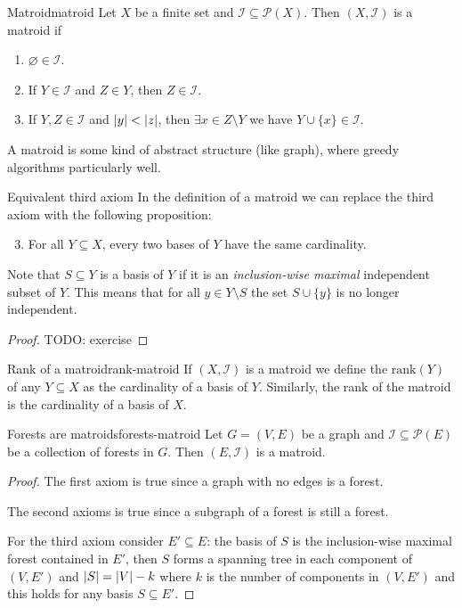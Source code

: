 \documentclass[12pt]{extarticle}
\begin{document}
\begin{definition}{Matroid}{matroid}
	Let $X$ be a finite set and $\mathcal I \subseteq \mathcal P(X)$.
	Then $(X, \mathcal I)$ is a matroid if
	\begin{enumerate}
		\item $\varnothing \in \mathcal I$.
		\item If $Y \in \mathcal I$ and $Z \in Y$, then $Z \in \mathcal I$.
		\item If $Y, Z \in \mathcal I$ and $\abs{y} < \abs{z}$, then $\exists x \in Z \setminus Y$ we
		      have $Y \cup \{x\} \in \mathcal I$.
	\end{enumerate}
\end{definition}

A matroid is some kind of abstract structure (like graph), where greedy algorithms 
particularly well.

\begin{lemma}{Equivalent third axiom}{}
	In the definition of a matroid we can replace the third axiom with the following proposition:
	\begin{enumerate}
		\setcounter{enumi}{2}
		\item For all $Y \subseteq X$, every two bases of $Y$ have the same cardinality.
	\end{enumerate}
\end{lemma}

Note that $S \subseteq Y$ is a basis of $Y$ if it is an \emph{inclusion-wise maximal} independent
subset of $Y$.
This means that for all $y \in Y \setminus S$ the set $S \cup \{y\}$ is no longer independent.

\begin{proof}
	TODO: exercise
\end{proof}

\begin{definition}{Rank of a matroid}{rank-matroid}
	If $(X, \mathcal I)$ is a matroid we define the $\mathrm{rank}(Y)$ of any $Y \subseteq X$ as the
	cardinality of a basis of $Y$. Similarly, the rank of the matroid is the cardinality of a basis
	of $X$.
\end{definition}

\begin{proposition}{Forests are matroids}{forests-matroid}
	Let $G=(V, E)$ be a graph and $\mathcal I \subseteq \mathcal P(E)$ be a collection of forests in
	$G$. Then $(E, \mathcal I)$ is a matroid.
\end{proposition}

\begin{proof}
	The first axiom is true since a graph with no edges is a forest.

	The second axioms is true since a subgraph of a forest is still a forest.

	For the third axiom consider $E' \subseteq E$: the basis of $S$ is the inclusion-wise maximal
	forest contained in $E'$, then $S$ forms a spanning tree in each component of $(V, E')$ and
	$\abs{S} = \abs{V} - k$ where $k$ is the number of components in $(V, E')$ and this holds for any
	basis $S \subseteq E'$.
\end{proof}
\end{document}
